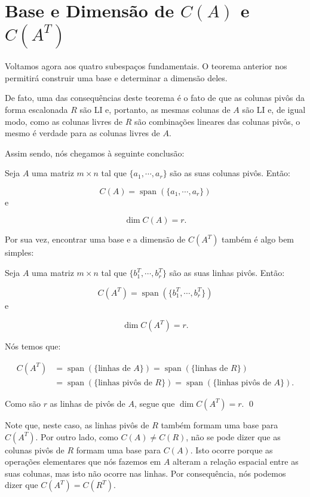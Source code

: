 \section{Base e Dimensão de $C(A)$ e $C(A^T)$}

Voltamos agora aos quatro subespaços fundamentais. O teorema anterior nos permitirá construir uma base e determinar a dimensão deles.

De fato, uma das consequências deste teorema é o fato de que as colunas pivôs da forma escalonada $R$ são LI e, portanto, as mesmas colunas de $A$ são LI e, de igual modo, como as colunas livres de $R$ são combinações lineares das colunas pivôs, o mesmo é verdade para as colunas livres de $A$.

Assim sendo, nós chegamos à seguinte conclusão:

\begin{Theorem}
	Seja $A$ uma matriz $m\times n$ tal que $\{a_1, \cdots, a_r\}$ são as suas colunas pivôs. Então:
	
	$$
	C(A) = \operatorname{span}(\{a_1, \cdots, a_r\})
	$$
	e
	
	$$
	\dim C(A) = r.
	$$
\end{Theorem}

Por sua vez, encontrar uma base e a dimensão de $C(A^T)$ também é algo bem simples:

\begin{Theorem}
	Seja $A$ uma matriz $m\times n$ tal que $\{b_1^T, \cdots, b_r^T\}$ são as suas linhas pivôs. Então:
	
	$$
	C(A^T) = \operatorname{span}(\{b_1^T, \cdots, b_r^T\})
	$$
	e
	
	$$
	\dim C(A^T) = r.
	$$
\end{Theorem}

\begin{Proof}
	Nós temos que:
	
	\begin{align*}
		C(A^T) &= \operatorname{span}(\{\text{linhas de $A$}\}) = \operatorname{span}(\{\text{linhas de $R$}\}) \\ &= \operatorname{span}(\{\text{linhas pivôs de $R$}\}) = \operatorname{span}(\{\text{linhas pivôs de $A$}\}).
	\end{align*}
	
	Como são $r$ as linhas de pivôs de $A$, segue que $\dim C(A^T) = r$.
	\qed
\end{Proof}

Note que, neste caso, as linhas pivôs de $R$ também formam uma base para $C(A^T)$. Por outro lado, como $C(A)\neq C(R)$, não se pode dizer que as colunas pivôs de $R$ formam uma base para $C(A)$. Isto ocorre porque as operações elementares que nós fazemos em $A$ alteram a relação espacial entre as suas colunas, mas isto não ocorre nas linhas. Por consequência, nós podemos dizer que $C(A^T) = C(R^T)$.

